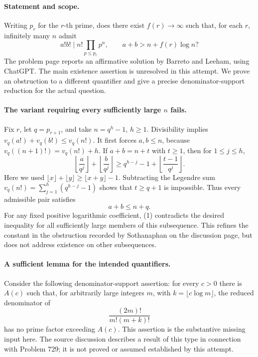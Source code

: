 \paragraph{Statement and scope.}
Writing \(p_r\) for the \(r\)-th prime, does there exist \(f(r)\to\infty\)
such that, for each \(r\), infinitely many \(n\) admit
\[
 a!b!\mid n!\prod_{p\leq p_r}p^n,\qquad
 a+b>n+f(r)\log n?
\]
The problem page reports an affirmative solution by Barreto and Leeham,
using ChatGPT. The main existence assertion is unresolved in this attempt.
We prove an obstruction to a different quantifier and give a precise
denominator-support reduction for the actual question.

\paragraph{The variant requiring every sufficiently large \(n\) fails.}
Fix \(r\), let \(q=p_{r+1}\), and take \(n=q^h-1\), \(h\geq1\).
Divisibility implies \(v_q(a!)+v_q(b!)\leq v_q(n!)\).
It first forces \(a,b\leq n\), because
\(v_q((n+1)!)=v_q(n!)+h\).
If \(a+b=n+t\) with \(t\geq1\), then for \(1\leq j\leq h\),
\[
 \left\lfloor\frac{a}{q^j}\right\rfloor+
 \left\lfloor\frac{b}{q^j}\right\rfloor
 \geq q^{h-j}-1+\left\lfloor\frac{t-1}{q^j}\right\rfloor.
\]
Here we used \(\lfloor x\rfloor+\lfloor y\rfloor\geq\lfloor x+y\rfloor-1\).
Subtracting the Legendre sum
\(v_q(n!)=\sum_{j=1}^{h}(q^{h-j}-1)\) shows that \(t\geq q+1\)
is impossible. Thus every admissible pair satisfies
\[
 a+b\leq n+q.
 \tag{1}
\]
For any fixed positive logarithmic coefficient, (1) contradicts the desired
inequality for all sufficiently large members of this subsequence.
This refines the constant in the obstruction recorded by
Sothanaphan on the discussion page, but does not address existence on
other subsequences.

\paragraph{A sufficient lemma for the intended quantifiers.}
Consider the following denominator-support assertion:
for every \(c>0\) there is \(A(c)\) such that, for arbitrarily large
integers \(m\), with \(k=\lfloor c\log m\rfloor\), the reduced denominator
of
\[
 \frac{(2m)!}{m!(m+k)!}
 \tag{2}
\]
has no prime factor exceeding \(A(c)\).
This assertion is the substantive missing input here. The source
discussion describes a result of this type in connection with Problem 729;
it is not proved or assumed established by this attempt.

